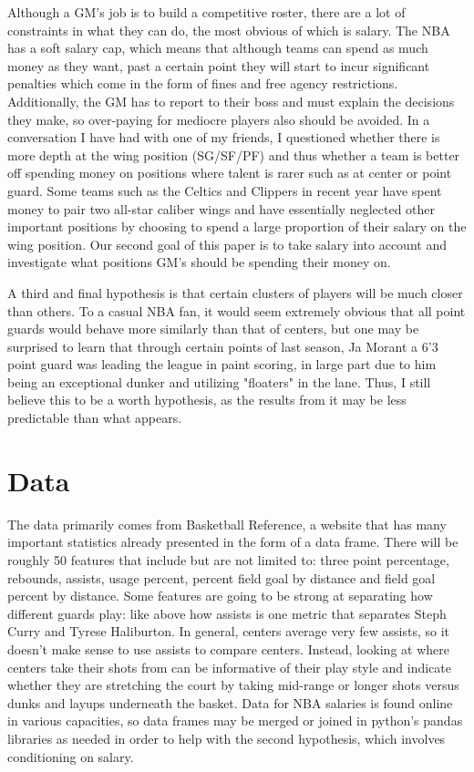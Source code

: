 \documentclass[12pt, letterpaper, titlepage]{article}
\begin{document}
Although a GM's job is to build a competitive roster, there are a lot of constraints
in what they can do, the most obvious of which is salary.  The NBA has a soft
salary cap, which means that although teams can spend as much money as they want,
past a certain point they will start to incur significant penalties which come in
the form of fines and free agency restrictions.  Additionally, the GM has to report
to their boss and must explain the decisions they make, so over-paying for mediocre
players also should be avoided.  In a conversation I have had with one of my
friends, I questioned whether there is more depth at the wing position (SG/SF/PF)
and thus whether a team is better off spending money on positions where talent
is rarer such as at center or point guard.  Some teams such as the Celtics and
Clippers in recent year have spent money to pair two all-star caliber wings and
have essentially neglected other important positions by choosing to spend a
large proportion of their salary on the wing position. Our second goal of this paper is to
take salary into account and investigate what positions GM's should be spending
their money on.

A third and final hypothesis is that certain clusters of players will be much
closer than others.  To a casual NBA fan, it would seem extremely obvious that
all point guards would behave more similarly than that of centers, but one may be
surprised to learn that through certain points of last season, Ja Morant a 6'3
point guard was leading the league in paint scoring, in large part due to him
being an exceptional dunker and utilizing "floaters" in the lane.  Thus, I still
believe this to be a worth hypothesis, as the results from it may be less
predictable than what appears.

\section{Data}
The data primarily comes from Basketball Reference, a website that has
many important statistics already presented in the form of a data frame.  There
will be roughly 50 features that include but are not limited to: three point
percentage, rebounds, assists, usage percent, percent field goal by distance and
field goal percent by distance.  Some features are going to be strong
at separating how different guards play: like above how assists is one metric
that separates Steph Curry and Tyrese Haliburton.  In general, centers average
very few assists, so it doesn't make sense to use assists to compare centers.
Instead, looking at where centers take their shots from can be informative of
their play style and indicate whether they are stretching the court by taking
mid-range or longer shots versus dunks and layups underneath the basket.  Data
for NBA salaries is found online in various capacities, so data frames may be
merged or joined in python's pandas libraries as needed in order to help with
the second hypothesis, which involves conditioning on salary.
\end{document}
